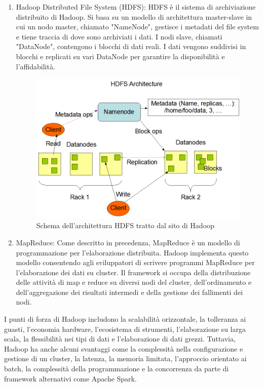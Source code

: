 \begin{enumerate}
    \item Hadoop Distributed File System (HDFS): HDFS è il sistema di archiviazione distribuito di Hadoop. Si basa su un modello di architettura master-slave in cui un nodo master, chiamato "NameNode", gestisce i metadati del file system e tiene traccia di dove sono archiviati i dati. I nodi slave, chiamati "DataNode", contengono i blocchi di dati reali. I dati vengono suddivisi in blocchi e replicati su vari DataNode per garantire la disponibilità e l'affidabilità.
    \begin{figure}[H]
        \centering
        \includegraphics[scale=.4]{img/hdfsarchitecture.png}
        \caption{Schema dell'architettura HDFS tratto dal sito di Hadoop}
        \label{hdfsarchitecture}
    \end{figure}
    \item MapReduce: Come descritto in precedenza, MapReduce è un modello di programmazione per l'elaborazione distribuita. Hadoop implementa questo modello consentendo agli sviluppatori di scrivere programmi MapReduce per l'elaborazione dei dati su cluster. Il framework si occupa della distribuzione delle attività di map e reduce su diversi nodi del cluster, dell'ordinamento e dell'aggregazione dei risultati intermedi e della gestione dei fallimenti dei nodi.
\end{enumerate}

I punti di forza di Hadoop includono la scalabilità orizzontale, la tolleranza ai guasti, l'economia hardware, l'ecosistema di strumenti, l'elaborazione su larga scala, la flessibilità nei tipi di dati e l'elaborazione di dati grezzi. Tuttavia, Hadoop ha anche alcuni svantaggi come la complessità nella configurazione e gestione di un cluster, la latenza, la memoria limitata, l'approccio orientato ai batch, la complessità della programmazione e la concorrenza da parte di framework alternativi come Apache Spark.

